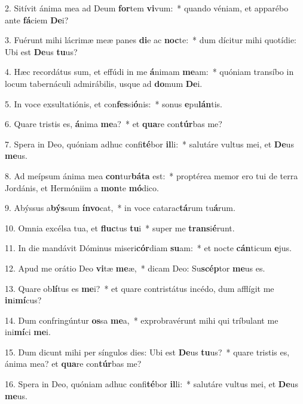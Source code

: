 2. Sitívit ánima mea ad Deum \textbf{for}tem \textbf{vi}vum:~*  quando véniam, et apparébo ante \textbf{fá}ciem \textbf{De}i?\

3. Fuérunt mihi lácrimæ meæ panes \textbf{di}e ac \textbf{noc}te:~*  dum dícitur mihi quotídie: Ubi est \textbf{De}us \textbf{tu}us?\

4. Hæc recordátus sum, et effúdi in me \textbf{á}nimam \textbf{me}am:~*  quóniam transíbo in locum tabernáculi admirábilis, usque ad \textbf{do}mum \textbf{De}i.\

5. In voce exsultatiónis, et con\textbf{fes}si\textbf{ó}nis:~*  sonus \textbf{e}pu\textbf{lán}tis.\

6. Quare tristis es, \textbf{á}nima \textbf{me}a?~*  et \textbf{qua}re con\textbf{túr}bas me?\

7. Spera in Deo, quóniam adhuc confi\textbf{té}bor \textbf{il}li:~*  salutáre vultus mei, et \textbf{De}us \textbf{me}us.\

8. Ad meípsum ánima mea \textbf{con}tur\textbf{bá}\textbf{ta} est:~*  proptérea memor ero tui de terra Jordánis, et Hermóniim a \textbf{mon}te \textbf{mó}dico.\

9. Abýssus a\textbf{býs}sum \textbf{ín}\textbf{vo}cat,~*  in voce catarac\textbf{tá}rum tu\textbf{á}rum.\

10. Omnia excélsa tua, et \textbf{fluc}tus \textbf{tu}i~*  super me \textbf{trans}i\textbf{é}runt.\

11. In die mandávit Dóminus miseri\textbf{cór}diam \textbf{su}am:~*  et nocte \textbf{cán}ticum \textbf{e}jus.\

12. Apud me orátio Deo \textbf{vi}tæ \textbf{me}æ,~*  dicam Deo: Su\textbf{scép}tor \textbf{me}us es.\

13. Quare ob\textbf{lí}tus es \textbf{me}i?~*  et quare contristátus incédo, dum afflígit me \textbf{in}i\textbf{mí}cus?\

14. Dum confringúntur \textbf{os}sa \textbf{me}a,~*  exprobravérunt mihi qui tríbulant me ini\textbf{mí}ci \textbf{me}i.\

15. Dum dicunt mihi per síngulos dies: Ubi est \textbf{De}us \textbf{tu}us?~*  quare tristis es, ánima mea? et \textbf{qua}re con\textbf{túr}bas me?\

16. Spera in Deo, quóniam adhuc confi\textbf{té}bor \textbf{il}li:~*  salutáre vultus mei, et \textbf{De}us \textbf{me}us.\

